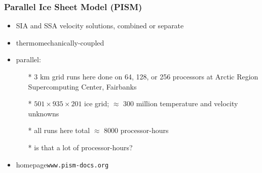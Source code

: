 \documentclass{beamer}
\begin{document}
\begin{frame}
  \frametitle{Parallel Ice Sheet Model (PISM)}

\begin{itemize}
\item SIA and SSA velocity solutions, combined or separate
\item thermomechanically-coupled
\item parallel:
  \begin{itemize}
  \item[*] 3 km grid runs here done on 64, 128, or 256 processors at Arctic Region Supercomputing Center, Fairbanks
  \item[*] $501 \times 935 \times 201$ ice grid; $\approx$ 300 million temperature and velocity unknowns
  \item[*] all runs here total $\approx$ 8000 processor-hours
  \item[*] is that a lot of processor-hours?
  \end{itemize}
\item homepage\qquad \texttt{www.pism-docs.org}
\end{itemize}
\end{frame}
\end{document}
